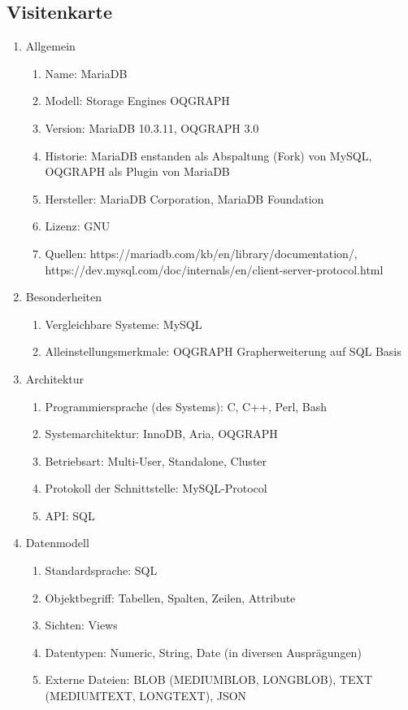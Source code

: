 \subsection{Visitenkarte}
\begin{enumerate}
	\item Allgemein
	\begin{enumerate}
		\item Name: MariaDB
		\item Modell: Storage Engines OQGRAPH
		\item Version: MariaDB 10.3.11, OQGRAPH 3.0
		\item Historie: MariaDB enstanden als Abspaltung (Fork) von MySQL, OQGRAPH als Plugin von MariaDB
		\item Hersteller: MariaDB Corporation, MariaDB Foundation
		\item Lizenz: GNU
		\item Quellen: https://mariadb.com/kb/en/library/documentation/, 
		https://dev.mysql.com/doc/internals/en/client-server-protocol.html
	\end{enumerate}
	\item Besonderheiten
	\begin{enumerate}
		\item Vergleichbare Systeme: MySQL
		\item Alleinstellungsmerkmale: OQGRAPH Grapherweiterung auf SQL Basis
	\end{enumerate}
	\item Architektur
	\begin{enumerate}
		\item Programmiersprache (des Systems): C, C++, Perl, Bash
		\item Systemarchitektur: InnoDB, Aria, OQGRAPH
		\item Betriebsart: Multi-User, Standalone, Cluster
		\item Protokoll der Schnittstelle: MySQL-Protocol
		\item API: SQL
	\end{enumerate}
	\item Datenmodell
	\begin{enumerate}
		\item Standardsprache: SQL
		\item Objektbegriff: Tabellen, Spalten, Zeilen, Attribute
		\item Sichten: Views
		\item Datentypen: Numeric, String, Date (in diversen Ausprägungen)
		\item Externe Dateien: BLOB (MEDIUMBLOB, LONGBLOB), TEXT (MEDIUMTEXT, LONGTEXT), JSON

\end{enumerate}
\end{enumerate}
